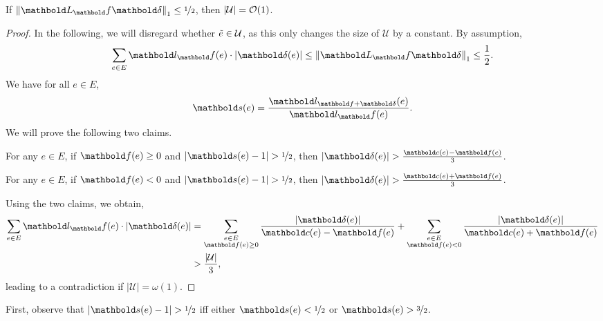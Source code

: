 \documentclass[nobib]{tufte-handout}
\newcommand{\etil}{\Tilde{e}}
\begin{document}
\begin{lem}
If $\norm{\mL_\vf \vdelta}_1 \leq \nicefrac{1}{2}$, then $|\mathcal{U}| = \LandauO{1}$.
\end{lem}
\begin{proof}
In the following, we will disregard whether $\etil \in \mathcal{U}$, as this only changes the size of $\mathcal{U}$ by a constant. By assumption, \begin{align*}
    \sum_{e \in E} \vl_\vf(e) \cdot |\vdelta(e)| \leq \norm{\mL_\vf\vdelta}_1 \leq \frac{1}{2}.
\end{align*} We have for all $e \in E$, \begin{align*}
    \vs(e) = \frac{\vl_{\vf + \vdelta}(e)}{\vl_\vf(e)}.
\end{align*} We will prove the following two claims.

\begin{clm}\label{clm:2:D:1:1}
For any $e \in E$, if $\vf(e) \geq 0$ and $|\vs(e) - 1| > \nicefrac{1}{2}$, then $|\vdelta(e)| > \frac{\vc(e) - \vf(e)}{3}$.
\end{clm}
\begin{clm}\label{clm:2:D:1:2}
For any $e \in E$, if $\vf(e) < 0$ and $|\vs(e) - 1| > \nicefrac{1}{2}$, then $|\vdelta(e)| > \frac{\vc(e) + \vf(e)}{3}$.
\end{clm}

Using the two claims, we obtain, \begin{align*}
    \sum_{e \in E} \vl_\vf(e) \cdot |\vdelta(e)| &= \sum_{\substack{e \in E \\ \vf(e) \geq 0}} \frac{|\vdelta(e)|}{\vc(e) - \vf(e)} + \sum_{\substack{e \in E \\ \vf(e) < 0}} \frac{|\vdelta(e)|}{\vc(e) + \vf(e)} \\
    &> \frac{|\mathcal{U}|}{3},
\end{align*} leading to a contradiction if $|\mathcal{U}| = \omega(1)$.
\end{proof}

First, observe that $|\vs(e) - 1| > \nicefrac{1}{2}$ iff either $\vs(e) < \nicefrac{1}{2}$ or $\vs(e) > \nicefrac{3}{2}$.
\end{document}
